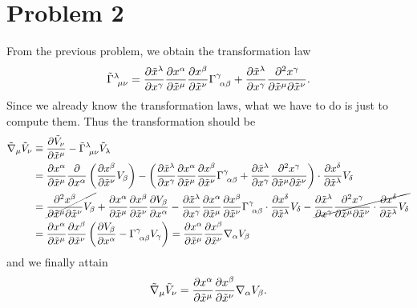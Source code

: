 \documentclass[a4paper,pdftex,10pt]{article}
\begin{document}
\clearpage
\section{Problem 2}

From the previous problem, we obtain the transformation law
\begin{equation}
  \tilde{\Gamma}^{\lambda}_{\ \mu\nu}
  =
  \pdv{\tilde{x}^{\lambda}}{x^{\gamma}}
  \pdv{x^{\alpha}}{\tilde{x}^{\mu}}
  \pdv{x^{\beta}}{\tilde{x}^{\nu}}
  \Gamma^{\gamma}_{\ \alpha\beta}
  +
  \pdv{\tilde{x}^{\lambda}}{x^{\gamma}}\pdv{x^{\gamma}}{\tilde{x}^{\mu}}{\tilde{x}^{\nu}}
  .
\end{equation}
Since we already know the transformation laws, what we have to do is just to compute them. Thus the transformation should be
\begin{align}
  \tilde{\nabla}_{\mu}\tilde{V}_{\nu}
   & \equiv
  \pdv{\tilde{V}_{\nu}}{\tilde{x}^{\mu}}
  -
  \tilde{\Gamma}^{\lambda}_{\ \mu\nu}\tilde{V}_{\lambda}
  \nonumber
  \\
   & =
  \pdv{x^{\alpha}}{\tilde{x}^{\mu}}\pdv{}{x^{\alpha}}\left( \pdv{x^{\beta}}{\tilde{x}^{\nu}}V_{\beta} \right)
  -
  \left(
  \pdv{\tilde{x}^{\lambda}}{x^{\gamma}}
  \pdv{x^{\alpha}}{\tilde{x}^{\mu}}
  \pdv{x^{\beta}}{\tilde{x}^{\nu}}
  \Gamma^{\gamma}_{\ \alpha\beta}
  +
  \pdv{\tilde{x}^{\lambda}}{x^{\gamma}}\pdv{x^{\gamma}}{\tilde{x}^{\mu}}{\tilde{x}^{\nu}}
  \right)
  \cdot
  \pdv{x^{\delta}}{\tilde{x}^{\lambda}}V_{\delta}
  \nonumber
  \\
   & =
  \cancel{
  \pdv{x^{\beta}}{\tilde{x}^{\mu}}{\tilde{x}^{\nu}}V_{\beta}
  }
  +
  \pdv{x^{\alpha}}{\tilde{x}^{\mu}}\pdv{x^{\beta}}{\tilde{x}^{\nu}}\pdv{V_{\beta}}{x^{\alpha}}
  -
  \pdv{\tilde{x}^{\lambda}}{x^{\gamma}}
  \pdv{x^{\alpha}}{\tilde{x}^{\mu}}
  \pdv{x^{\beta}}{\tilde{x}^{\nu}}
  \Gamma^{\gamma}_{\ \alpha\beta}
  \cdot
  \pdv{x^{\delta}}{\tilde{x}^{\lambda}}V_{\delta}
  -
  \cancel{
  \pdv{\tilde{x}^{\lambda}}{x^{\gamma}}\pdv{x^{\gamma}}{\tilde{x}^{\mu}}{\tilde{x}^{\nu}}
  \cdot
  \pdv{x^{\delta}}{\tilde{x}^{\lambda}}V_{\delta}
  }
  \nonumber
  \\
   & =
  \pdv{x^{\alpha}}{\tilde{x}^{\mu}}\pdv{x^{\beta}}{\tilde{x}^{\nu}}
  \left(
  \pdv{V_{\beta}}{x^{\alpha}}
  -
  \Gamma^{\gamma}_{\ \alpha\beta}V_{\gamma}
  \right)
  =
  \pdv{x^{\alpha}}{\tilde{x}^{\mu}}\pdv{x^{\beta}}{\tilde{x}^{\nu}}\nabla_{\alpha}V_{\beta}
\end{align}
and we finally attain
\begin{equation}  
  \tilde{\nabla}_{\mu}\tilde{V}_{\nu}
  =
  \pdv{x^{\alpha}}{\tilde{x}^{\mu}}\pdv{x^{\beta}}{\tilde{x}^{\nu}}\nabla_{\alpha}V_{\beta}
  .
\end{equation}
\end{document}
